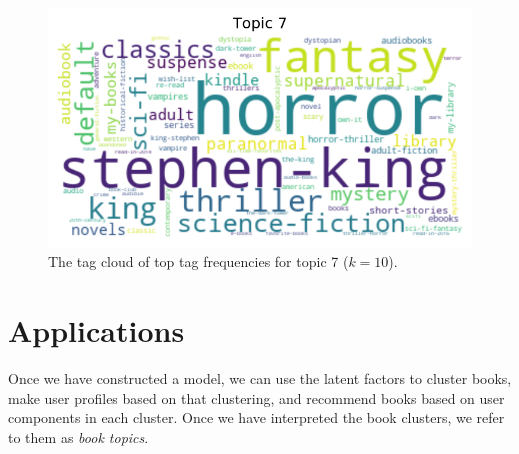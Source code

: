 \documentclass[11pt]{article}
\begin{document}






\newpage


\begin{figure}
\vspace{-30pt}
\centering
  \includegraphics[width=\linewidth]{../image/goodreads-topics-profiles-recommendations/tag-cloud-10-7.png}
  \caption[Tag Cloud for Topic 7 ($k=10$)]{The tag cloud of top tag frequencies for topic 7 ($k=10$).}
  \label{fig:tag-cloud-10-7}
  \vspace{-30pt}
\end{figure}



    \hypertarget{applications}{%
\section{Applications}\label{applications}}




Once we have constructed a model, we can use the latent factors to cluster books, make user profiles based on that clustering,
and recommend books based on user components in each cluster.
Once we have interpreted the book clusters, we refer to them as \emph{book topics}.
\end{document}
